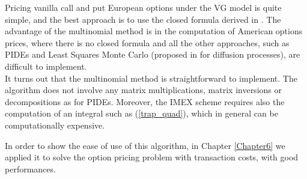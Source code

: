 Pricing vanilla call and put European options under the VG model is quite simple, and the best approach is to use the closed formula derived in \cite{MCC98}.
The advantage of the multinomial method is in the computation of American options prices, where there is no closed formula and all the other approaches, 
such as PIDEs and Least Squares Monte Carlo (proposed in \cite{LoSc01} for diffusion processes), are difficult to implement. \\
It turns out that the
multinomial method is straightforward to implement. The algorithm does
not involve any matrix multiplications, matrix inversions or decompositions as for PIDEs. Moreover, the IMEX scheme requires also the computation of an integral such as 
(\ref{trap_quad}), which in general can be computationally expensive. 

In order to show the ease of use of this algorithm, in Chapter \ref{Chapter6} we applied it to solve the option pricing problem with 
transaction costs, with good performances.
